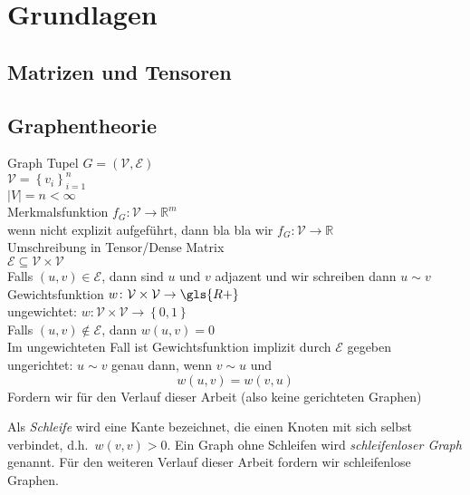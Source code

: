 \chapter{Grundlagen}

\section{Matrizen und Tensoren}

\section{Graphentheorie}

Graph Tupel $G = \left(\mathcal{V}, \mathcal{E}\right)$\\
$\mathcal{V} = {\left\{ v_i \right\}}^n_{i=1}$\\
$\left| V \right| = n < \infty$\\
Merkmalsfunktion $f_G \colon \mathcal{V} \to \mathbb{R}^m$\\
wenn nicht explizit aufgeführt, dann bla bla wir $f_G \colon \mathcal{V} \to \mathbb{R}$\\
Umschreibung in Tensor/Dense Matrix\\
$\mathcal{E} \subseteq \mathcal{V} \times \mathcal{V}$\\
Falls $\left( u, v \right) \in \mathcal{E}$, dann sind $u$ und $v$ adjazent und wir schreiben dann $u \sim v$\\
Gewichtsfunktion $w \colon \mathcal{V} \times \mathcal{V} \to \gls{R+}$\\
ungewichtet: $w \colon \mathcal{V} \times \mathcal{V} \to \left\{ 0, 1 \right\}$\\
Falls $\left( u, v \right) \notin \mathcal{E}$, dann $w\left(u, v\right) = 0$\\
Im ungewichteten Fall ist Gewichtsfunktion implizit durch $\mathcal{E}$ gegeben\\

ungerichtet:
$u \sim v$ genau dann, wenn $v \sim u$ und
\begin{equation}
  w\left(u, v\right) = w\left(v, u\right)
\end{equation}
Fordern wir für den Verlauf dieser Arbeit (also keine gerichteten Graphen)

Als \emph{Schleife} wird eine Kante bezeichnet, die einen Knoten mit sich selbst verbindet, d.h.\ $w\left(v, v\right) > 0$.
Ein Graph ohne Schleifen wird \emph{schleifenloser Graph} genannt.
Für den weiteren Verlauf dieser Arbeit fordern wir schleifenlose Graphen.\\

